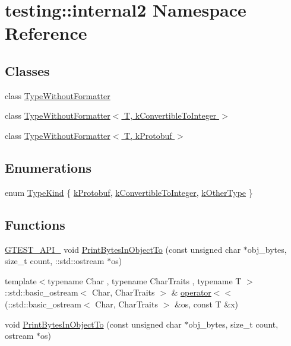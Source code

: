 \hypertarget{namespacetesting_1_1internal2}{}\section{testing\+:\+:internal2 Namespace Reference}
\label{namespacetesting_1_1internal2}
\subsection*{Classes}
\begin{DoxyCompactItemize}
\item 
class \hyperlink{classtesting_1_1internal2_1_1TypeWithoutFormatter}{Type\+Without\+Formatter}
\item 
class \hyperlink{classtesting_1_1internal2_1_1TypeWithoutFormatter_3_01T_00_01kConvertibleToInteger_01_4}{Type\+Without\+Formatter$<$ T, k\+Convertible\+To\+Integer $>$}
\item 
class \hyperlink{classtesting_1_1internal2_1_1TypeWithoutFormatter_3_01T_00_01kProtobuf_01_4}{Type\+Without\+Formatter$<$ T, k\+Protobuf $>$}
\end{DoxyCompactItemize}
\subsection*{Enumerations}
\begin{DoxyCompactItemize}
\item 
enum \hyperlink{namespacetesting_1_1internal2_aeb8161b0b3ee503347b0662d7028fd57}{Type\+Kind} \{ \hyperlink{namespacetesting_1_1internal2_aeb8161b0b3ee503347b0662d7028fd57a14aaf98a2547ecf43eef0868d54b1383}{k\+Protobuf}, 
\hyperlink{namespacetesting_1_1internal2_aeb8161b0b3ee503347b0662d7028fd57a9bdcf3f1548f498b2b7f097306ea0224}{k\+Convertible\+To\+Integer}, 
\hyperlink{namespacetesting_1_1internal2_aeb8161b0b3ee503347b0662d7028fd57abe8aaea44751d6ebd0cdf5bd94451db1}{k\+Other\+Type}
 \}
\end{DoxyCompactItemize}
\subsection*{Functions}
\begin{DoxyCompactItemize}
\item 
\hyperlink{gtest-port_8h_aa73be6f0ba4a7456180a94904ce17790}{G\+T\+E\+S\+T\+\_\+\+A\+P\+I\+\_\+} void \hyperlink{namespacetesting_1_1internal2_a9fbf8e07c0f94dc74d6ef5e56cd3c553}{Print\+Bytes\+In\+Object\+To} (const unsigned char $\ast$obj\+\_\+bytes, size\+\_\+t count, \+::std\+::ostream $\ast$os)
\item 
{\footnotesize template$<$typename Char , typename Char\+Traits , typename T $>$ }\\\+::std\+::basic\+\_\+ostream$<$ Char, Char\+Traits $>$ \& \hyperlink{namespacetesting_1_1internal2_a07dbe129beb8952074f04b599dfce39b}{operator$<$$<$} (\+::std\+::basic\+\_\+ostream$<$ Char, Char\+Traits $>$ \&os, const T \&x)
\item 
void \hyperlink{namespacetesting_1_1internal2_abfb9aa80365f93b952e9a4bea09947a8}{Print\+Bytes\+In\+Object\+To} (const unsigned char $\ast$obj\+\_\+bytes, size\+\_\+t count, ostream $\ast$os)
\end{DoxyCompactItemize}
